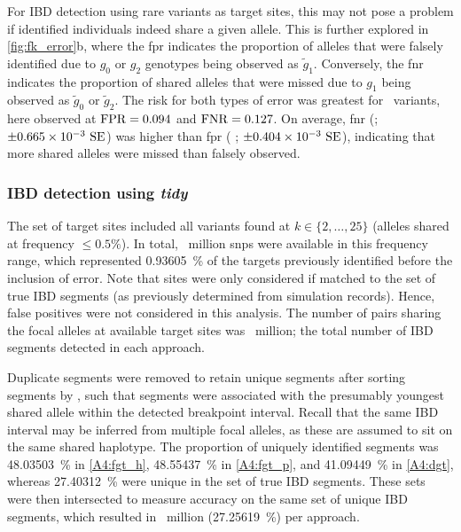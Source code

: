 %

%

For IBD detection using rare variants as target sites, this may not pose a problem if identified individuals indeed share a given allele.
This is further explored in \cref{fig:fk_error}{b}, where the \gls{fpr} indicates the proportion of alleles that were falsely identified due to $g_0$ or $g_2$ genotypes being observed as $\tilde{g}_1$.
Conversely, the \gls{fnr} indicates the proportion of shared alleles that were missed due to $g_1$ being observed as $\tilde{g}_0$ or $\tilde{g}_2$.
The risk for both types of error was greatest for ~variants, here observed at ${\operatorname{FPR}=\dec{0.09356644}}$ and ${\operatorname{FNR}=\dec{0.126583}}$.
On average, \gls{fnr}  (; ${\pm \dec{0.665030e-3}~\text{SE}}$) was higher than \gls{fpr} ( ; ${\pm \dec{0.403969e-3}~\text{SE}}$), indicating that more shared alleles were missed than falsely observed.



%
\subsubsection{IBD detection using \emph{tidy}}
%

The set of target sites included all \fk{} variants found at ${k \in \lbrace 2, \ldots, 25 \rbrace}$ (\ie alleles shared at frequency ${\leq 0.5\%}$).
In total, ~million \glspl{snp} were available in this frequency range, which represented \SI{0.93605}{\percent} of the targets previously identified before the inclusion of error.
Note that sites were only considered if matched to the set of true IBD segments (as previously determined from simulation records).
Hence, false positives were not considered in this analysis.
The number of pairs sharing the focal alleles at available target sites was ~million; \ie the total number of IBD segments detected in each approach.

Duplicate segments were removed to retain unique segments after sorting segments by \fk{}, such that segments were associated with the presumably youngest shared allele within the detected breakpoint interval.
Recall that the same IBD interval may be inferred from multiple focal alleles, as these are assumed to sit on the same shared haplotype.
The proportion of uniquely identified segments was \SI{48.03503}{\percent} in \cref{A4:fgt_h},
\SI{48.55437}{\percent} in \cref{A4:fgt_p}, and \SI{41.09449}{\percent} in \cref{A4:dgt}, whereas
\SI{27.40312}{\percent} were unique in the set of true IBD segments.
These sets were then intersected to measure accuracy on the same set of unique IBD segments, which resulted in ~million (\SI{27.25619}{\percent}) per approach.

